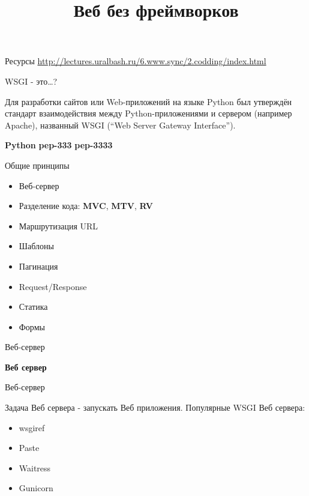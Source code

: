 
\usepackage{array}      %
\usepackage{dirtytalk}  %

\title{Веб без фреймворков}



\frame{\titlepage}

\begin{frame}{Ресурсы}
  \url{http://lectures.uralbash.ru/6.www.sync/2.codding/index.html}
\end{frame}

\begin{frame}{WSGI - это\ldots?}

    Для разработки сайтов или Web-приложений на языке Python был утверждён
    стандарт взаимодействия между Python-приложениями и сервером (например
    Apache), названный WSGI (“Web Server Gateway Interface”).

    \textbf{Python}\newline
    \textbf{pep-333}\newline
    \textbf{pep-3333}\newline

\end{frame}

\begin{frame}{Общие принципы}

  \begin{itemize}
    \item Веб-сервер
    \item Разделение кода: \textbf{MVC}, \textbf{MTV}, \textbf{RV}
    \item Маршрутизация URL
    \item Шаблоны
    \item Пагинация
    \item Request/Response
    \item Статика
    \item Формы
  \end{itemize}

\end{frame}


\begin{frame}{Веб-сервер}

  \textbf{Веб сервер}

\end{frame}


\begin{frame}{Веб-сервер}

  Задача Веб сервера - запускать Веб приложения.\newline\newline
    Популярные WSGI Веб сервера:\newline

  \begin{itemize}
    \item wsgiref
    \item Paste
    \item Waitress
    \item Gunicorn
  \end{itemize}


\end{frame}


